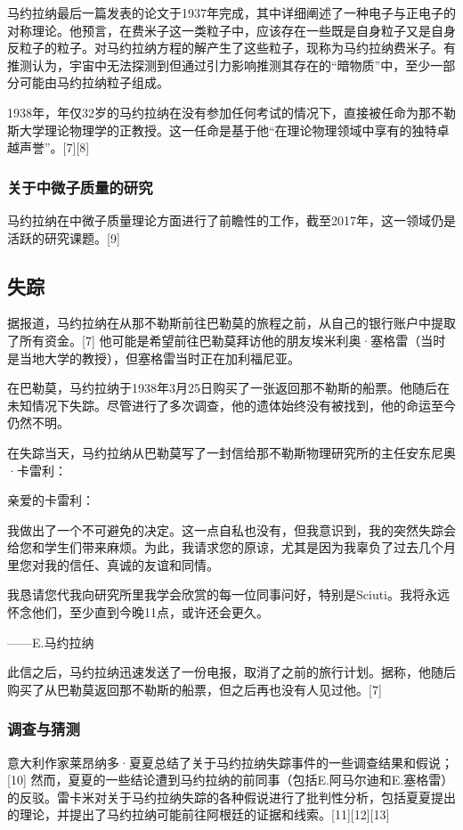 马约拉纳最后一篇发表的论文于1937年完成，其中详细阐述了一种电子与正电子的对称理论。他预言，在费米子这一类粒子中，应该存在一些既是自身粒子又是自身反粒子的粒子。对马约拉纳方程的解产生了这些粒子，现称为马约拉纳费米子。有推测认为，宇宙中无法探测到但通过引力影响推测其存在的“暗物质”中，至少一部分可能由马约拉纳粒子组成。

1938年，年仅32岁的马约拉纳在没有参加任何考试的情况下，直接被任命为那不勒斯大学理论物理学的正教授。这一任命是基于他“在理论物理领域中享有的独特卓越声誉”。[7][8]
\subsubsection{关于中微子质量的研究}
马约拉纳在中微子质量理论方面进行了前瞻性的工作，截至2017年，这一领域仍是活跃的研究课题。[9]
\subsection{失踪}
据报道，马约拉纳在从那不勒斯前往巴勒莫的旅程之前，从自己的银行账户中提取了所有资金。[7] 他可能是希望前往巴勒莫拜访他的朋友埃米利奥·塞格雷（当时是当地大学的教授），但塞格雷当时正在加利福尼亚。

在巴勒莫，马约拉纳于1938年3月25日购买了一张返回那不勒斯的船票。他随后在未知情况下失踪。尽管进行了多次调查，他的遗体始终没有被找到，他的命运至今仍然不明。

在失踪当天，马约拉纳从巴勒莫写了一封信给那不勒斯物理研究所的主任安东尼奥·卡雷利：

亲爱的卡雷利：

我做出了一个不可避免的决定。这一点自私也没有，但我意识到，我的突然失踪会给您和学生们带来麻烦。为此，我请求您的原谅，尤其是因为我辜负了过去几个月里您对我的信任、真诚的友谊和同情。

我恳请您代我向研究所里我学会欣赏的每一位同事问好，特别是Sciuti。我将永远怀念他们，至少直到今晚11点，或许还会更久。

——E.马约拉纳

此信之后，马约拉纳迅速发送了一份电报，取消了之前的旅行计划。据称，他随后购买了从巴勒莫返回那不勒斯的船票，但之后再也没有人见过他。[7]
\subsubsection{调查与猜测}
意大利作家莱昂纳多·夏夏总结了关于马约拉纳失踪事件的一些调查结果和假说；[10] 然而，夏夏的一些结论遭到马约拉纳的前同事（包括E.阿马尔迪和E.塞格雷）的反驳。雷卡米对关于马约拉纳失踪的各种假说进行了批判性分析，包括夏夏提出的理论，并提出了马约拉纳可能前往阿根廷的证据和线索。[11][12][13]

